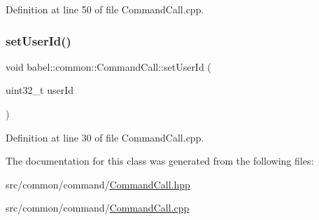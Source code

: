 Definition at line 50 of file Command\+Call.\+cpp.

\mbox{\label{classbabel_1_1common_1_1_command_call_ae572ee038cdc860fadc9131d14e4b123}} 
\subsubsection{\texorpdfstring{set\+User\+Id()}{setUserId()}}
{\footnotesize\ttfamily void babel\+::common\+::\+Command\+Call\+::set\+User\+Id (\begin{DoxyParamCaption}\item[{uint32\+\_\+t}]{user\+Id }\end{DoxyParamCaption})}



Definition at line 30 of file Command\+Call.\+cpp.



The documentation for this class was generated from the following files\+:\begin{DoxyCompactItemize}
\item 
src/common/command/\mbox{\hyperlink{_command_call_8hpp}{Command\+Call.\+hpp}}\item 
src/common/command/\mbox{\hyperlink{_command_call_8cpp}{Command\+Call.\+cpp}}\end{DoxyCompactItemize}
